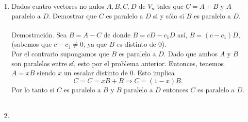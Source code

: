 \begin{enumerate}[\bfseries 1.]
\item Dados cuatro vectores no nulos $A,B,C,D$ de $V_n$ tales que $C=A+B$ y $A$ paralelo a $D$. Demostrar que $C$ es paralelo a $D$ si y sólo si $B$ es paralelo a $D$.\\\\
    Demostración.\;  Sea $B=A-C$ de donde $B=cD-c_1D$ así, $B=(c-c_1)D$, (sabemos que $c-c_1\neq 0$, ya que $B$ es distinto de $0$).\\
    Por el contrario supongamos que $B$ es paralelo a $D$. Dado que ambos $A$ y $B$ son paralelos entre sí, esto por el problema anterior. Entonces, tenemos $A=xB$ siendo $x$ un escalar distinto de $0$. Esto implica $$C=C=xB+B \Longrightarrow C = (1-x)B.$$ Por lo tanto si $C$ es paralelo a $B$ y $B$ paralelo a $D$ entonces $C$ es paralelo a $D$.\\\\ 

\item 
\begin{enumerate}[\bfseries a)]
    

\end{enumerate}
\end{enumerate}
